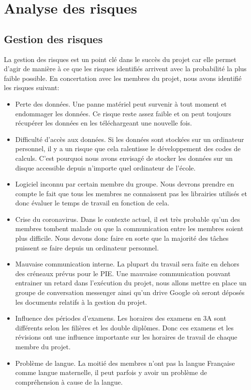 \chapter*{Analyse des risques}
\label{sec:risques}
\section*{Gestion des risques}
La gestion des risques est un point clé dans le succès du projet car elle permet d'agir de manière à ce que les risques identifiés arrivent avec la probabilité la plus faible possible. En concertation avec les membres du projet, nous avons identifié les risques suivant:

\begin{itemize}
	\item Perte des données. Une panne matériel peut survenir à tout moment et endommager les données. Ce risque reste assez faible et on peut toujours récupérer les données en les téléchargeant une nouvelle fois.
	
	\item Difficulté d'accès aux données. Si les données sont stockées sur un ordinateur personnel, il y a un risque que cela ralentisse le développement des codes de calculs. C'est pourquoi nous avons envisagé de stocker les données sur un disque accessible depuis n'importe quel ordinateur de l'école.
	
	\item Logiciel inconnu par certain membre du groupe. Nous devrons prendre en compte le fait que tous les membres ne connaissent pas les librairies utilisés et donc évaluer le temps de travail en fonction de cela.
	
	\item Crise du coronavirus. Dans le contexte actuel, il est très probable qu'un des membres tombent malade ou que la communication entre les membres soient plus difficile. Nous devons donc faire en sorte que la majorité des tâches puissent se faire depuis un ordinateur personnel.
	
	\item Mauvaise communication interne. La plupart du travail sera faite en dehors des créneaux prévus pour le PIE. Une mauvaise communication pouvant entrainer un retard dans l'exécution du projet, nous allons mettre en place un groupe de conversation messenger ainsi qu'un drive Google où seront déposés les documents relatifs à la gestion du projet.
	
	\item Influence des périodes d'examens. Les horaires des examens en 3A sont différents selon les filières et les double diplômes. Donc ces examens et les révisions ont une influence importante sur les horaires de travail de chaque membre du projet.
	
	\item Problème de langue. La moitié des membres n'ont pas la langue Française comme langue maternelle, il peut parfois y avoir un problème de compréhension à cause de la langue.
	
	
\end{itemize}

